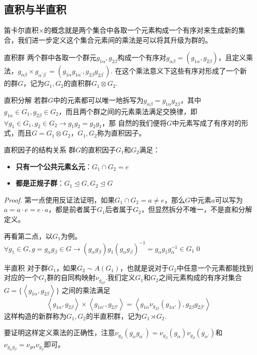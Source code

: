 \subsection{直积与半直积}
笛卡尔直积$\times$的概念就是两个集合中各取一个元素构成一个有序对来生成新的集合，我们进一步定义这个集合元素间的乘法是可以将其升级为群的。
\begin{define}{直积群}
    两个群中各取一个群元$g_{1\alpha},g_{2\beta}$构成一个有序对$g_{\alpha\beta}=(g_{1\alpha},g_{2\beta})$，且定义乘法，$g_{\alpha\beta}\times g_{\alpha^\prime\beta^\prime}
    =(g_{1\alpha}g_{1\alpha^\prime},g_{2\beta}g_{2\beta^\prime})$. 在这个乘法意义下这些有序对形成了一个新的群$G$，记为$G_1,G_2$的直积群$G_1\otimes G_2$.
\end{define}
\begin{define}{直积分解}
    若群$G$中的元素都可以唯一地拆写为$g_{\alpha\beta}=g_{1\alpha}g_{2\beta}$，其中$g_{1\alpha}\in G_1,g_{2\beta}\in G_2$，而且两个群之间的元素乘法满足交换律，即$\forall g_1\in G_1,g_2\in G_2\rightarrow g_1g_2=g_2g_1$，那
    自然的我们便将$G$中元素写成了有序对的形式，而且$G=G_1\otimes G_2$，$G_1,G_2$称为直积因子。
\end{define}
\begin{theorem}{直积因子的结构关系}
    群$G$的直积因子$G_1$和$G_2$满足：
    \begin{itemize}
        \item \textbf{只有一个公共元素幺元}：$G_1\cap G_2={e}$
        \item \textbf{都是正规子群}：$G_1\unlhd G, G_2\unlhd G$
    \end{itemize}
\end{theorem}
\begin{proof}
    第一点使用反证法证明，如果$G_1\cap G_2=a\neq e$，那么$G$中元素$a$可以写为$a=a\cdot e=e\cdot a$，都是前者属于$G_1$后者属于$G_2$，但显然拆分不唯一，不是直和分解定义。

    再看第二点，以$G_1$为例。$\forall g_1\in G,g=g_\alpha g_\beta\in G\rightarrow (g_\alpha g_\beta)g_1(g_\alpha g_\beta)^{-1}=g_{\alpha} g_1 g_{\alpha}^{-1}\in G_1$\qed
\end{proof}

\begin{define}{半直积}
    对于群$G_1$，如果$G_2\sim A(G_1)$，也就是说对于$G_2$中任意一个元素都能找到对应的一个$G_1$群的自同构映射$\nu_{g_{2\beta}}$.我们定义$G_1$和$G_2$之间元素构成的有序对集合$G=\{\left \langle g_{1\alpha},g_{2\beta}\right\rangle\}$
    之间的乘法满足
    \[\left\langle {{g_{1\alpha }},{g_{2\beta }}} \right\rangle  \times \left\langle {{g_{1\alpha '}},{g_{2\beta '}}} \right\rangle  = \left\langle {{g_{1\alpha }}{\nu _{{g_{2\beta }}}}({g_{1\alpha '}}),{g_{2\beta }}{g_{2\beta '}}} \right\rangle \]
    这样构造的新群称为$G_1,G_2$的半直积群，记为$G_1 \rtimes G_2$.
\end{define}
要证明这样定义乘法的正确性，注意$\nu_{g_{\beta}}(g_{\alpha}g_{\alpha^\prime})=\nu_{g_{\beta}}(g_{\alpha})\nu_{g_{\beta}}(g_{\alpha^\prime})$和$\nu_{g_\alpha g_\beta}=\nu_{g\alpha}\nu_{g_\beta}$即可。

